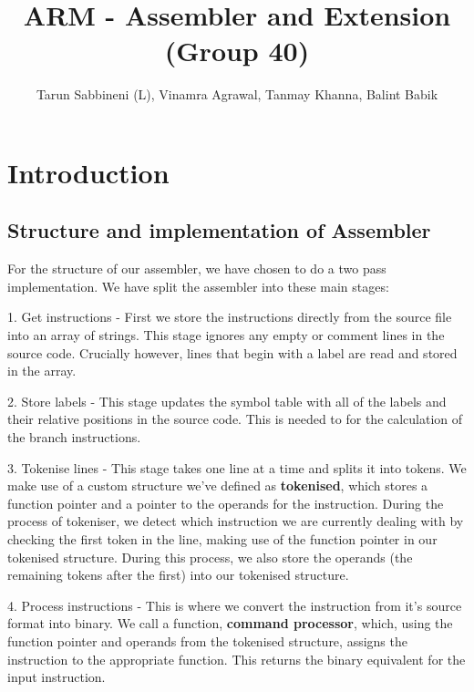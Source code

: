 \documentclass[11pt]{article}
\begin{document}
\title{ARM - Assembler and Extension (Group 40)}
\author{Tarun Sabbineni (L), Vinamra Agrawal, Tanmay Khanna, Balint Babik}

\maketitle

\section{Introduction}

\subsection{Structure and implementation of Assembler}

For the structure of our assembler, we have chosen to do a two pass implementation. We have split the assembler into these main stages: 

1. Get instructions - First we store the instructions directly from the source file into an array of strings. This stage ignores any empty or comment lines in the source code. Crucially however, lines that begin with a label are read and stored in the array. 

2. Store labels - This stage updates the symbol table with all of the labels and their relative positions in the source code. This is needed to for the calculation of the branch instructions.

3. Tokenise lines - This stage takes one line at a time and splits it into tokens. We make use of a custom structure we've defined as \textbf{tokenised}, which stores a function pointer and a pointer to the operands for the instruction. During the process of tokeniser, we detect which instruction we are currently dealing with by checking the first token in the line, making use of the function pointer in our tokenised structure. During this process, we also store the operands (the remaining tokens after the first) into our tokenised structure.

4. Process instructions - This is where we convert the instruction from it's source format into binary. We call a function, \textbf{command processor}, which, using the function pointer and operands from the tokenised structure, assigns the instruction to the appropriate function. This returns the binary equivalent for the input instruction.
\end{document}
